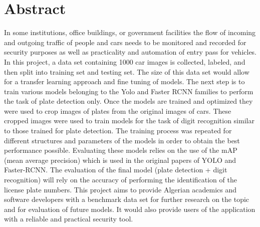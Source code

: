 \chapter*{Abstract}
In some institutions, office buildings, or government facilities
the flow of incoming and outgoing traffic of people and cars needs
to be monitored and recorded for security purposes as well as practicality
and automation of entry pass for vehicles.
In this project, a data set containing 1000 car images is collected, labeled, and then split into
training set and testing set. The size of this data set would allow for a transfer learning
approach and fine tuning of models.
The next step is to train various models belonging to the Yolo and
Faster RCNN families to perform the task of plate detection only. Once the models are
trained and optimized they were used to crop images of plates from the
original images of cars. These cropped images were used to train models for the
task of digit recognition similar to those trained for plate detection. The training
process was repeated for different structures and parameters of the models in
order to obtain the best performance possible. Evaluating these models relies on
the use of the mAP (mean average precision) which is used in the original papers of
YOLO and Faster-RCNN. The evaluation of the final model (plate detection + digit recognition)
will rely on the accuracy of performing the identification of the license plate numbers.
This project aims to provide Algerian academics and software developers with
a benchmark data set for further research on the topic and for evaluation of
future models. It would also provide users of the application with a reliable and
practical security tool.
